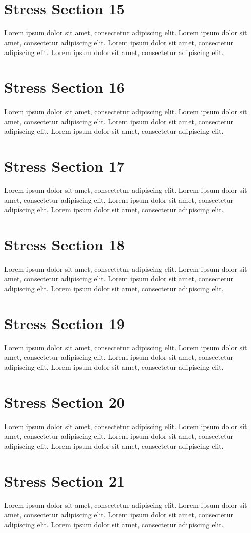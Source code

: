 \documentclass{article}
\begin{document}
\section{Stress Section 15}
Lorem ipsum dolor sit amet, consectetur adipiscing elit. Lorem ipsum dolor sit amet, consectetur adipiscing elit. Lorem ipsum dolor sit amet, consectetur adipiscing elit. Lorem ipsum dolor sit amet, consectetur adipiscing elit. \newpage
\section{Stress Section 16}
Lorem ipsum dolor sit amet, consectetur adipiscing elit. Lorem ipsum dolor sit amet, consectetur adipiscing elit. Lorem ipsum dolor sit amet, consectetur adipiscing elit. Lorem ipsum dolor sit amet, consectetur adipiscing elit. \newpage
\section{Stress Section 17}
Lorem ipsum dolor sit amet, consectetur adipiscing elit. Lorem ipsum dolor sit amet, consectetur adipiscing elit. Lorem ipsum dolor sit amet, consectetur adipiscing elit. Lorem ipsum dolor sit amet, consectetur adipiscing elit. \newpage
\section{Stress Section 18}
Lorem ipsum dolor sit amet, consectetur adipiscing elit. Lorem ipsum dolor sit amet, consectetur adipiscing elit. Lorem ipsum dolor sit amet, consectetur adipiscing elit. Lorem ipsum dolor sit amet, consectetur adipiscing elit. \newpage
\section{Stress Section 19}
Lorem ipsum dolor sit amet, consectetur adipiscing elit. Lorem ipsum dolor sit amet, consectetur adipiscing elit. Lorem ipsum dolor sit amet, consectetur adipiscing elit. Lorem ipsum dolor sit amet, consectetur adipiscing elit. \newpage
\section{Stress Section 20}
Lorem ipsum dolor sit amet, consectetur adipiscing elit. Lorem ipsum dolor sit amet, consectetur adipiscing elit. Lorem ipsum dolor sit amet, consectetur adipiscing elit. Lorem ipsum dolor sit amet, consectetur adipiscing elit. \newpage
\section{Stress Section 21}
Lorem ipsum dolor sit amet, consectetur adipiscing elit. Lorem ipsum dolor sit amet, consectetur adipiscing elit. Lorem ipsum dolor sit amet, consectetur adipiscing elit. Lorem ipsum dolor sit amet, consectetur adipiscing elit. \newpage
\end{document}

